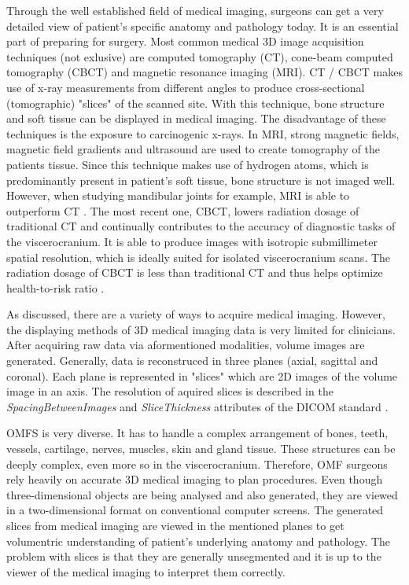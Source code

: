 Through the well established field of medical imaging, surgeons can get a very detailed view of patient’s specific anatomy and pathology today. 
It is an essential part of preparing for surgery.
Most common medical 3D image acquisition techniques (not exlusive) are computed tomography (CT), cone-beam computed tomography (CBCT) and magnetic resonance imaging (MRI).
CT / CBCT makes use of x-ray measurements from different angles to produce cross-sectional (tomographic) "slices" of the scanned site.
With this technique, bone structure and soft tissue can be displayed in medical imaging.
The disadvantage of these techniques is the exposure to carcinogenic x-rays.
In MRI, strong magnetic fields, magnetic field gradients and ultrasound are used to create tomography of the patients tissue.
Since this technique makes use of hydrogen atoms, which is predominantly present in patient's soft tissue, bone structure is not imaged well.
However, when studying mandibular joints for example, MRI is able to outperform CT \cite{RN65}.
The most recent one, CBCT, lowers radiation dosage of traditional CT and continually contributes to the accuracy of diagnostic tasks of the viscerocranium.
It is able to produce images with isotropic submillimeter spatial resolution, which is ideally suited for isolated viscerocranium scans. 
The radiation dosage of CBCT is less than traditional CT and thus helps optimize health-to-risk ratio \cite{WHITE2008689}.

As discussed, there are a variety of ways to acquire medical imaging.
However, the displaying methods of 3D medical imaging data is very limited for clinicians.
After acquiring raw data via aformentioned modalities, volume images are generated. 
Generally, data is reconstruced in three planes (axial, sagittal and coronal).
Each plane is represented in "slices" which are 2D images of the volume image in an axis.
The resolution of aquired slices is described in the \textit{SpacingBetweenImages} and \textit{SliceThickness} attributes of the DICOM standard \cite{DICOMStandard}.

OMFS is very diverse. It has to handle a complex arrangement of bones, teeth, vessels, cartilage, nerves, muscles, skin and gland tissue.
These structures can be deeply complex, even more so in the viscerocranium.
Therefore, OMF surgeons rely heavily on accurate 3D medical imaging to plan procedures.
Even though three-dimensional objects are being analysed and also generated, they are viewed in a two-dimensional format on conventional computer screens.
The generated slices from medical imaging are viewed in the mentioned planes to get volumentric understanding of patient's underlying anatomy and pathology.
The problem with slices is that they are generally unsegmented and it is up to the viewer of the medical imaging to interpret them correctly.


